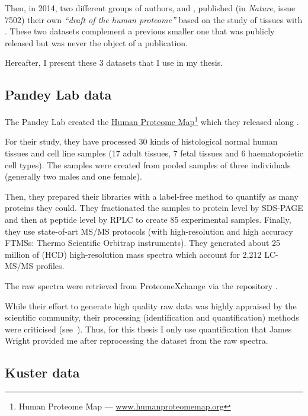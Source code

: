 Then, in 2014, two different groups of authors, \cite{PandeyData}
and \cite{KusterData}, published (in \textit{Nature},
issue 7502) their own \emph{``draft of the human proteome''}
based on the study of tissues with \ms. These two datasets complement a previous
smaller one that was publicly released but was never the object of a publication.

Hereafter, I present these 3 datasets that I use in my thesis.

\subsection{Pandey Lab data}

The Pandey Lab \citep{PandeyData} created the
\href{http://www.humanproteomemap.org/}%
{Human Proteome Map}\footnote{Human Proteome Map --- %
\href{http://www.humanproteomemap.org/}{www.humanproteomemap.org}} which
they released along .

For their study, they have processed 30 kinds of histological normal human
tissues and cell line samples (17 adult tissues, 7 fetal tissues and 6
haematopoietic cell types). The samples were created from pooled samples of three
individuals (generally two males and one female).

Then, they prepared their libraries with a label-free method to quantify
as many proteins they could. They fractionated the samples to protein level by
\gls{SDS-PAGE} and then at peptide level by \gls{RPLC} to create 85 experimental
samples. Finally, they use state-of-art \gls{MS/MS} protocols
(with high-resolution and high accuracy \glspl{FTMS}:
Thermo Scientific Orbitrap instruments).
They generated about 25 million of (\gls{HCD})
high-resolution mass spectra which account for 2,212 \gls{LC-MS/MS} profiles.

The raw spectra were retrieved from ProteomeXchange via the repository
.

While their effort to generate high quality raw data was highly appraised
by the scientific community, their processing
(identification and quantification) methods were
criticised (see~\cite{Ezkurdia2014-qx}). Thus, for this thesis I only use
quantification that James Wright provided me after reprocessing the dataset
from the raw spectra.

\subsection{Kuster data}

